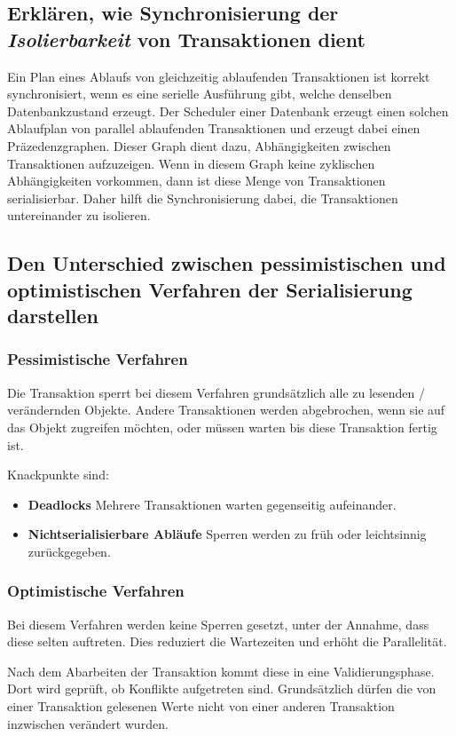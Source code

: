 \subsection{Erklären, wie Synchronisierung der \emph{Isolierbarkeit} von Transaktionen dient}
Ein Plan eines Ablaufs von gleichzeitig ablaufenden Transaktionen ist korrekt synchronisiert, wenn es eine serielle Ausführung gibt, welche denselben Datenbankzustand erzeugt. Der Scheduler einer Datenbank erzeugt einen solchen Ablaufplan von parallel ablaufenden Transaktionen und erzeugt dabei einen Präzedenzgraphen. Dieser Graph dient dazu, Abhängigkeiten zwischen Transaktionen aufzuzeigen. Wenn in diesem Graph keine zyklischen Abhängigkeiten vorkommen, dann ist diese Menge von Transaktionen serialisierbar. Daher hilft die Synchronisierung dabei, die Transaktionen untereinander zu isolieren.

\subsection{Den Unterschied zwischen pessimistischen und optimistischen Verfahren der Serialisierung darstellen}

\subsubsection{Pessimistische Verfahren}
Die Transaktion sperrt bei diesem Verfahren grundsätzlich alle zu lesenden / verändernden Objekte. Andere Transaktionen werden abgebrochen, wenn sie auf das Objekt zugreifen möchten, oder müssen warten bis diese Transaktion fertig ist.

Knackpunkte sind:
\begin{itemize}
  \item \textbf{Deadlocks} 
  Mehrere Transaktionen warten gegenseitig aufeinander.
  \item \textbf{Nichtserialisierbare Abläufe}
  Sperren werden zu früh oder leichtsinnig zurückgegeben.
\end{itemize}

\subsubsection{Optimistische Verfahren}
Bei diesem Verfahren werden keine Sperren gesetzt, unter der Annahme, dass diese selten auftreten. Dies reduziert die Wartezeiten und erhöht die Parallelität.

Nach dem Abarbeiten der Transaktion kommt diese in eine Validierungsphase. Dort wird geprüft, ob Konflikte aufgetreten sind. Grundsätzlich dürfen die von einer Transaktion gelesenen Werte nicht von einer anderen Transaktion inzwischen verändert wurden.

